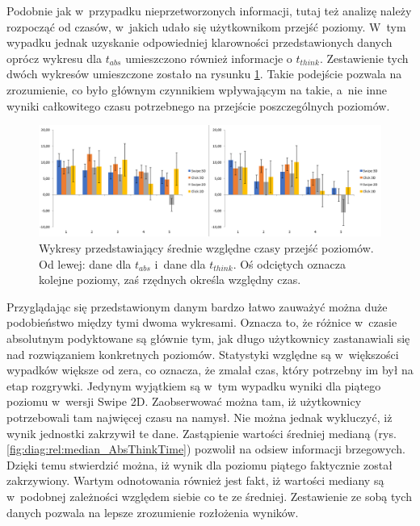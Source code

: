 \documentclass[a4paper,12pt,numbers=noenddot]{report}
\begin{document}
Podobnie jak w~przypadku nieprzetworzonych informacji, tutaj też analizę należy rozpocząć od czasów, w~jakich udało się użytkownikom przejść poziomy. W~tym wypadku jednak uzyskanie odpowiedniej klarowności przedstawionych danych oprócz wykresu dla $t_{abs}$ umieszczono również informacje o $t_{think}$. Zestawienie tych dwóch wykresów umieszczone zostało na rysunku \ref{fig:diag:rel:mean_AbsThinkTime}. Takie podejście pozwala na zrozumienie, co było głównym czynnikiem wpływającym na takie, a~nie inne wyniki całkowitego czasu potrzebnego na przejście poszczególnych poziomów.

\begin{figure}[h!]
	\centering
  	\includegraphics[width=\linewidth]{diag/rel_mean_absThinkTime.png}
	\caption{Wykresy przedstawiający średnie względne czasy przejść poziomów. Od lewej: dane dla $t_{abs}$ i~dane dla $t_{think}$. Oś odciętych oznacza kolejne poziomy, zaś rzędnych określa względny czas.}
	\label{fig:diag:rel:mean_AbsThinkTime}
\end{figure}

Przyglądając się przedstawionym danym bardzo łatwo zauważyć można duże podobieństwo między tymi dwoma wykresami. Oznacza to, że różnice w~czasie absolutnym podyktowane są głównie tym, jak długo użytkownicy zastanawiali się nad rozwiązaniem konkretnych poziomów. Statystyki względne są w~większości wypadków większe od zera, co oznacza, że zmalał czas, który potrzebny im był na etap rozgrywki. Jedynym wyjątkiem są w~tym wypadku wyniki dla piątego poziomu w~wersji Swipe 2D. Zaobserwować można tam, iż użytkownicy potrzebowali tam najwięcej czasu na namysł. Nie można jednak wykluczyć, iż wynik jednostki zakrzywił te dane. Zastąpienie wartości średniej medianą (rys. \ref{fig:diag:rel:median_AbsThinkTime}) pozwolił na odsiew informacji brzegowych. Dzięki temu stwierdzić można, iż wynik dla poziomu piątego faktycznie został zakrzywiony. Wartym odnotowania również jest fakt, iż wartości mediany są w~podobnej zależności względem siebie co te ze średniej. Zestawienie ze sobą tych danych pozwala na lepsze zrozumienie rozłożenia wyników.
\end{document}
